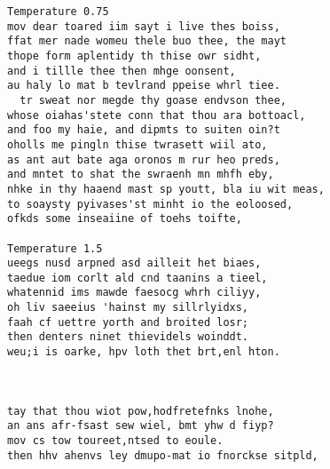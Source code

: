 \documentclass[11pt]{article}
\begin{document}
\begin{Verbatim}[commandchars=\\\{\}]
Temperature 0.75
mov dear toared iim sayt i live thes boiss,
ffat mer nade womeu thele buo thee, the mayt
thope form aplentidy th thise owr sidht,
and i tillle thee then mhge oonsent,
au haly lo mat b tevlrand ppeise whrl tiee.
  tr sweat nor megde thy goase endvson thee,
whose oiahas'stete conn that thou ara bottoacl,
and foo my haie, and dipmts to suiten oin?t
oholls me pingln thise twrasett wiil ato,
as ant aut bate aga oronos m rur heo preds,
and mntet to shat the swraenh mn mhfh eby,
nhke in thy haaend mast sp youtt, bla iu wit meas,
to soaysty pyivases'st minht io the eoloosed,
ofkds some inseaiine of toehs toifte,

Temperature 1.5
ueegs nusd arpned asd ailleit het biaes,
taedue iom corlt ald cnd taanins a tieel,
whatennid ims mawde faesocg whrh ciliyy,
oh liv saeeius 'hainst my sillrlyidxs,
faah cf uettre yorth and broited losr;
then denters ninet thievidels woinddt.
weu;i is oarke, hpv loth thet brt,enl hton.


                   
tay that thou wiot pow,hodfretefnks lnohe,
an ans afr-fsast sew wiel, bmt yhw d fiyp?
mov cs tow toureet,ntsed to eoule.
then hhv ahenvs ley dmupo-mat io fnorckse sitpld,


    \end{Verbatim}


    
    
    
    
\end{document}

